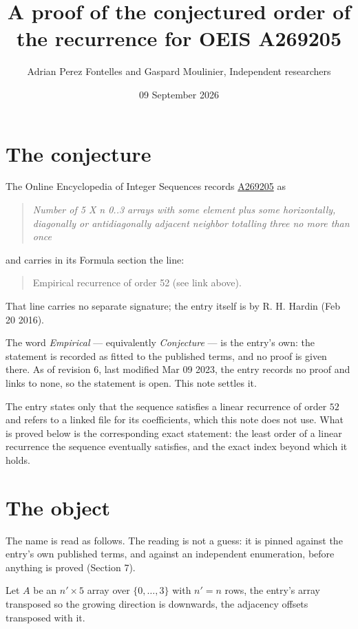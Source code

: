 \documentclass[11pt]{article}
\title{A proof of the conjectured order of the recurrence for OEIS A269205}
\author{Adrian Perez Fontelles and Gaspard Moulinier, Independent researchers}
\date{09 September 2026}
\theoremstyle{definition}
\begin{document}
\maketitle
\section{The conjecture}

The Online Encyclopedia of Integer Sequences records \href{https://oeis.org/A269205}{A269205} as

\begin{quote}\itshape Number of 5 X n 0..3 arrays with some element plus some horizontally, diagonally or antidiagonally adjacent neighbor totalling three no more than once\end{quote}

and carries in its Formula section the line:

\begin{quote}\ttfamily Empirical recurrence of order 52 (see link above).\end{quote}

That line carries no separate signature; the entry itself is by R. H. Hardin (Feb 20 2016).

The word {\itshape Empirical} --- equivalently {\itshape Conjecture} --- is the entry's own: the statement is recorded as fitted to the published terms, and no proof is given there. As of revision 6, last modified Mar 09 2023, the entry records no proof and links to none, so the statement is open. This note settles it.

The entry states only that the sequence satisfies a linear recurrence of order $52$ and refers to a linked file for its coefficients, which this note does not use. What is proved below is the corresponding exact statement: the least order of a linear recurrence the sequence eventually satisfies, and the exact index beyond which it holds.

\section{The object}

The name is read as follows. The reading is not a guess: it is pinned against the entry's own published terms, and against an independent enumeration, before anything is proved (Section 7).

Let $A$ be an $n' \times 5$ array over $\{0,\dots,3\}$ with $n' = n$ rows, the entry's array transposed so the growing direction is downwards, the adjacency offsets transposed with it.
\end{document}
